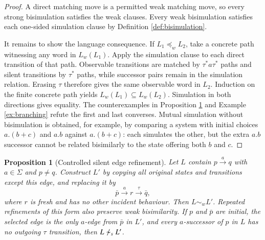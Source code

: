 \documentclass[JMCS,submit]{resources/ISRP}
\newtheorem{proposition}[theorem]{Proposition}
\theoremstyle{definition}
\theoremstyle{remark}
\numberwithin{equation}{section}
\newcommand{\TAU}{\tau}
\newcommand{\strongsim}{\mathrel{\sim_{s}}}
\newcommand{\weaksim}{\mathrel{\sim_{w}}}
\newcommand{\weakpre}{\mathrel{\preceq_{w}}}
\begin{document}
\begin{proof}
A direct matching move is a permitted weak matching move, so every strong
bisimulation satisfies the weak clauses. Every weak bisimulation satisfies each
one-sided simulation clause by Definition \ref{def:bisimulation}.

It remains to show the language consequence. If $L_1\weakpre L_2$, take a
concrete path witnessing any word in $L_w(L_1)$. Apply the simulation clause to
each direct transition of that path. Observable transitions are matched by
$\TAU^*a\TAU^*$ paths and silent transitions by $\TAU^*$ paths, while successor
pairs remain in the simulation relation. Erasing $\TAU$ therefore gives the same
observable word in $L_2$. Induction on the finite concrete path yields
$L_w(L_1)\subseteq L_w(L_2)$. Simulation in both directions gives equality.
The counterexamples in Proposition \ref{prop:silent-refinement} and Example
\ref{ex:branching} refute the first and last converses. Mutual simulation without
bisimulation is obtained, for example, by comparing a system with initial choices
$a.(b+c)$ and $a.b$ against $a.(b+c)$: each simulates the other, but the extra
$a.b$ successor cannot be related bisimilarly to the state offering both $b$ and
$c$.
\end{proof}

\begin{proposition}[Controlled silent edge refinement]
\label{prop:silent-refinement}
Let $L$ contain $p\xrightarrow{a}q$ with $a\in\Sigma$ and $p\neq q$. Construct
$L'$ by copying all original states and transitions except this edge, and replacing
it by
\begin{equation}\label{eq:silent-refinement}
 \bar p\xrightarrow{a}r\xrightarrow{\TAU}\bar q,
\end{equation}
where $r$ is fresh and has no other incident behaviour. Then $L\weaksim L'$.
Repeated refinements of this form also preserve weak bisimilarity. If $p$ and
$\bar p$ are initial, the selected edge is the only $a$-edge from $\bar p$ in
$L'$, and every $a$-successor of $p$ in $L$ has no outgoing $\TAU$ transition,
then $L\not\strongsim L'$.
\end{proposition}
\end{document}
